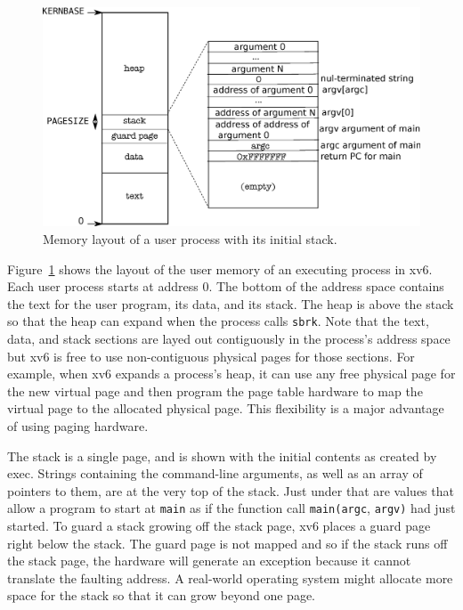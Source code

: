 \begin{figure}[t]
\center
\includegraphics[scale=0.5]{fig/processlayout.eps}
\caption{Memory layout of a user process with its initial stack.}
\label{fig:processlayout}
\end{figure}

Figure~\ref{fig:processlayout}
shows the layout of the user memory of an executing process in xv6.
Each user process starts at address 0. The bottom of the address space
contains the text for the user program, its data, and its stack.
The heap is above the stack so that the heap can expand when the process
calls
\lstinline{sbrk}.
Note that the text, data, and stack sections are layed out contiguously in the
process's address space but xv6 is free to use non-contiguous physical pages for
those sections. For example, when xv6 expands a process's heap, it can use any
free physical page for the new virtual page and then program the page table
hardware to map the virtual page to the allocated physical page.  This
flexibility is a major advantage of using paging hardware.

The stack is a single page, and is
shown with the initial contents as created by exec.
Strings containing the command-line arguments, as well as an
array of pointers to them, are at the very top of the stack.
Just under that are values that allow a program
to start at
\lstinline{main}
as if the function call
\lstinline{main(argc},
\lstinline{argv)}
had just started.
To guard a stack growing off the stack page, xv6 places a guard page right below
the stack.  The guard page is not mapped and so if the stack runs off the stack
page, the hardware will generate an exception because it cannot translate the
faulting address.
A real-world operating system might allocate more space for the stack so that it can
grow beyond one page.
